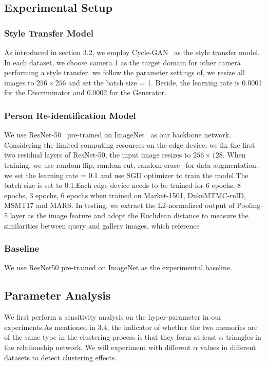 \documentclass{article}
\begin{document}
\subsection{Experimental Setup}


\subsubsection{Style Transfer Model}
As introduced in section 3.2,  we employ Cycle-GAN~\cite{zhu2017unpaired} as the style transfer model. In each dataset, we choose camera 1 as the target domain for other camera performing a style transfer. we follow the parameter settings of, we resize all images to $256\times 256$ and set the batch size = 1. Beside, the learning rate is 0.0001 for the Discriminator and 0.0002 for the Generator.

\subsubsection{Person Re-identification Model}
We use ResNet-50~\cite{he2016deep} pre-trained on ImageNet~\cite{deng2009imagenet} as our backbone network. Considering the limited computing resources on the edge device, we fix the first two residual layers of ResNet-50, the input image resizes to $256\times128$. When training, we use random flip, random cut, random erase~\cite{zhong2017random} for data augmentation. we set the learning rate = 0.1 and use SGD optimizer to train the model.The batch size is set to 0.1.Each edge device needs to be trained for 6 epochs, 8 epochs, 3 epochs, 6 epochs when trained on Market-1501, DukeMTMC-reID, MSMT17 and MARS. In testing, we extract the L2-normalized output of Pooling-5 layer as the image feature and adopt the Euclidean distance to measure the similarities between query and gallery images, which reference ~\cite{zhong2019invariance}

\subsubsection{Baseline}
We use ResNet50 pre-trained on ImageNet as the experimental baseline.

\subsection{Parameter Analysis}
We first perform a sensitivity analysis on the hyper-parameter in our experiments.As mentioned in 3.4, the indicator of whether the two memories are of the same type in the clustering process is that they form at least $\alpha$ triangles in the relationship network. We will experiment with different $\alpha$ values in different datasets to detect clustering effects.
\end{document}
